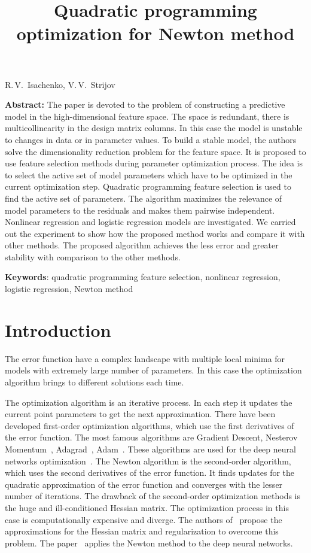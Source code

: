 \documentclass[a4paper,12pt]{article}
\theoremstyle{plain} %
\theoremstyle{definition} %
\theoremstyle{remark} %
\begin{document}
		
		\title
	{Quadratic programming optimization for Newton method}
	\date{}
	\maketitle
	\begin{center}
		R.\,V.~Isachenko,
		V.\,V.~Strijov
	\end{center}
	\textbf{Abstract:} 
	The paper is devoted to the problem of constructing a predictive model in the high-dimensional feature space.
	The space is redundant, there is multicollinearity in the design matrix columns.
	In this case the model is unstable to changes in data or in parameter values. 
	To build a stable model, the authors solve the dimensionality reduction problem for the feature space.
	It is proposed to use feature selection methods during parameter optimization process.
	The idea is to select the active set of model parameters which have to be optimized in the current optimization step.
	Quadratic programming feature selection is used to find the active set of parameters. 
	The algorithm maximizes the relevance of model parameters to the residuals and makes them pairwise independent. 
	Nonlinear regression and logistic regression models are investigated. 
	We carried out the experiment to show how the proposed method works and compare it with other methods. 
	The proposed algorithm achieves the less error and greater stability with comparison to the other methods.
	
	\bigskip
	\textbf{Keywords}: quadratic programming feature selection, nonlinear regression, logistic regression, Newton method
	
	\section*{Introduction}
The error function have a complex landscape with multiple local minima for models with extremely large number of parameters. 
In this case the optimization algorithm brings to different solutions each time.

The optimization algorithm is an iterative process. 
In each step it updates the current point parameters to get the next approximation.
There have been developed first-order optimization algorithms, which use the first derivatives of the error function. 
The most famous algorithms are Gradient Descent, Nesterov Momentum~\cite{nesterov1983momentum}, Adagrad~\cite{duchi2011adagrad}, Adam~\cite{kingma2014adam}. 
These algorithms are used for the deep neural networks optimization~\cite{goodfellow2016deeplearningbook}. 
The Newton algorithm is the second-order algorithm, which uses the second derivatives of the error function. 
It finds updates for the quadratic approximation of the error function and converges with the lesser number of iterations.
The drawback of the second-order optimization methods is the huge and ill-conditioned Hessian matrix. 
The optimization process in this case is computationally expensive and diverge. 
The authors of~\cite{avriel2003nonlinear,blaschke1997convergence} propose the approximations for the Hessian matrix and regularization to overcome this problem.
The paper~\cite{botev2017newtondeeplearning} applies the Newton method to the deep neural networks.
\end{document}

